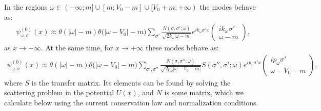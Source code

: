 \documentclass[12pt]{article}
\numberwithin{equation}{section}
\begin{document}
In the regions $\omega\in(-\infty;m]\cup[m;V_0-m]\cup[V_0+m;+\infty)$ the modes behave as:
\begin{gather} \label{asym1}
\mathit{\psi}^{(0)}_{\omega,\sigma}(x)\approx\theta(|\omega|-m)\theta\Big(|\omega-V_0|-m\Big)\sum_{\sigma'}\frac{N(\sigma,\sigma';\omega)}{\sqrt{2k_\omega|\omega-m|}}e^{ik_\omega\sigma'x}\begin{pmatrix}
		ik_\omega\sigma'\\
		\omega-m
	\end{pmatrix},
\end{gather}
as $x\rightarrow-\infty$.
At the same time, for $x\rightarrow +\infty$ these modes behave as:
\begin{gather}\label{asym2}
\mathit{\psi}^{(0)}_{\omega,\sigma}(x)\approx \theta(|\omega|-m)\theta\Big(|\omega-V_0|-m\Big) \sum_{\sigma',\sigma''}\frac{N(\sigma,\sigma'';\omega)}{\sqrt{2p_\omega|\omega-V_0-m|}} S(\sigma'',\sigma';\omega)e^{ip_\omega\sigma'x}\begin{pmatrix}
		ip_\omega\sigma'\\
		\omega-V_0-m
	\end{pmatrix},
\end{gather}
where $S$ is the transfer matrix. Its elements can be found by solving the scattering problem in the potential $U(x)$, and $N$ is some matrix, which we calculate below using the current conservation law and normalization conditions.


\end{document}
